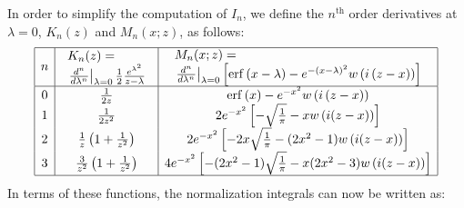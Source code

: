 \documentclass[a4paper,10pt,twosided]{article}
\begin{document}
In order to simplify the  computation of  $I_n$, we define the $n^\mathrm{th}$ order derivatives at $\lambda=0$, $K_n(z)$ and $M_n(x;z)$, as follows:
\begin{equation}
\begin{array}{|c|c|c|}
\hline
n   
& \begin{array}{l}  K_n(z)   = \\  \left. \frac{d^n}{d\lambda^n}\right|_{\lambda=0} \frac{1}{2} \frac{e^{\lambda^2}}{z-\lambda}  \end{array}
& \begin{array}{l}  M_n(x;z) = \\  \left. \frac{d^n}{d\lambda^n}\right|_{\lambda=0} \left[ \mathrm{erf}\left(x-\lambda\right)-  e^{-\left(x-\lambda\right)^2}w\left(i\left(z-x\right)\right)  \right] \end{array}
\\ \hline 
   0   & \frac{1}{2z}                                &  \mathrm{erf}\left(x\right)-e^{-x^2}w\left( i \left(z-x\right)\right) 
\\ 1   & \frac{1}{2z^2}                             & 2 e^{-x^2} \left[ - \sqrt{\frac{1}{\pi}}   -       x w\left(i(z-x)  \right) \right]
\\ 2   & \frac{1}{z}\left(1 + \frac{1}{z^2}\right) & 2 e^{-x^2} \left[ - 2x  \sqrt{\frac{1}{\pi}}  - (2x^2-1) w\left(i(z-x)\right) \right]
\\ 3   & \frac{3}{z^2}\left(1+\frac{1}{z^2}\right) & 4 e^{-x^2} \left[ - (2x^2-1)\sqrt{\frac{1}{\pi}} -x(2x^2-3)w\left(i(z-x)\right)   \right]
\\ \hline
\end{array}
\end{equation}
In terms of these functions, the normalization integrals can now be written as:
\end{document}
